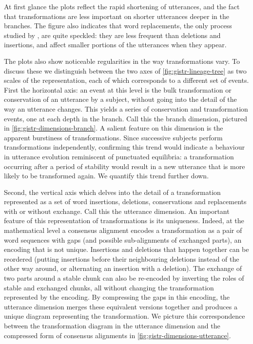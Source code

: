 At first glance the plots reflect the rapid shortening of utterances,
and the fact that transformations are less important on shorter
utterances deeper in the branches. The figure also indicates that word
replacements, the only process studied by \textcite{lerique-2018-semantic-drift},
are quite speckled: they are less frequent than deletions and
insertions, and affect smaller portions of the utterances when they
appear. 

The plots also show noticeable regularities in the way transformations
vary. To discuss these we distinguish between the two axes of
\cref{fig:gistr-lineage-tree} as two scales of the representation, each
of which corresponds to a different set of events. First the horizontal
axis: an event at this level is the bulk transformation or conservation
of an utterance by a subject, without going into the detail of the way
an utterance changes. This yields a series of conservation and
transformation events, one at each depth in the branch. Call this the
branch dimension, pictured in \cref{fig:gistr-dimensions-branch}. A
salient feature on this dimension is the apparent burstiness of
transformations. Since successive subjects perform transformations
independently, confirming this trend would indicate a behaviour in
utterance evolution reminiscent of punctuated equilibria: a
transformation occurring after a period of stability would result in a
new utterance that is more likely to be transformed again. We quantify
this trend further down.

Second, the vertical axis which delves into the detail of a
transformation represented as a set of word insertions, deletions,
conservations and replacements with or without exchange. Call this the
utterance dimension. An important feature of this representation of
transformations is its uniqueness. Indeed, at the mathematical level a
consensus alignment encodes a transformation as a pair of word sequences
with gaps (and possible sub-alignments of exchanged parts), an encoding
that is not unique. Insertions and deletions that happen together can be
reordered (putting insertions before their neighbouring deletions
instead of the other way around, or alternating an insertion with a
deletion). The exchange of two parts around a stable chunk can also be
re-encoded by inverting the roles of stable and exchanged chunks, all
without changing the transformation represented by the encoding. By
compressing the gaps in this encoding, the utterance dimension merges
these equivalent versions together and produces a unique diagram
representing the transformation. We picture this correspondence between
the transformation diagram in the utterance dimension and the compressed
form of consensus alignments in \cref{fig:gistr-dimensions-utterance}.


